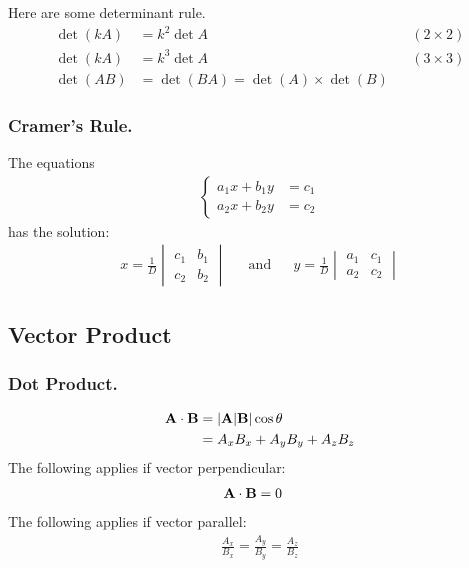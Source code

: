 \documentclass[../main.tex]{subfiles}
\begin{document}
Here are some determinant rule.
\begin{align*}
    \det(kA)&=k^2\det A &&(2\times2)\\
    \det(kA)&=k^3\det A &&(3\times3)\\
    \det(AB)&=\det(BA)=\det(A)\times\det (B)
\end{align*}

\subsubsection*{Cramer's Rule.} The equations
\begin{align*}
    \begin{cases}
        a_1x+b_1y&=c_1\\
        a_2x+b_2y&=c_2
    \end{cases}
\end{align*}
has the solution:
\begin{align*}
    x=\frac{1}{D}
    \begin{vmatrix}
        c_1&b_1\\
        c_2&b_2
    \end{vmatrix}&&\mathrm{and}&&
    y=\frac{1}{D}
    \begin{vmatrix}
        a_1&c_1\\
        a_2&c_2
    \end{vmatrix}
\end{align*}

\subsection*{Vector Product}

\subsubsection*{Dot Product.}
\begin{align*}
    \mathbf{A}\cdot\mathbf{B}&=|\mathbf{A}|\mathbf{B}|\cos\theta\\
    &=A_xB_x+A_yB_y+A_zB_z
\end{align*}
The following applies if vector perpendicular:
\begin{align*}
    \mathbf{A}\cdot\mathbf{B}&=0
\end{align*}
The following applies if vector parallel:
\begin{align*}
    \frac{A_x}{B_x}=\frac{A_y}{B_y}=\frac{A_z}{B_z}
\end{align*}
\end{document}
